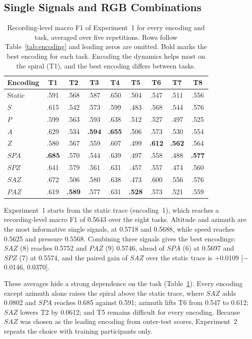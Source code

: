 \subsection{Single Signals and RGB Combinations}
\label{sec:classifiers}
\begin{table}[t]
\centering\small
\caption{Recording-level macro F1 of Experiment~1 for every encoding and task, averaged over five repetitions. Rows follow Table~\ref{tab:encoding} and leading zeros are omitted. Bold marks the best encoding for each task. Encoding the dynamics helps most on the spiral (T1), and the best encoding differs between tasks.}
\label{tab:heatmap}
\setlength{\tabcolsep}{3pt}
\begin{tabular}{@{}lcccccccc@{}}
\toprule
Encoding & T1 & T2 & T3 & T4 & T5 & T6 & T7 & T8\\
\midrule
Static & .591 & .568 & .587 & .650 & .504 & .547 & .511 & .556\\
\midrule
$S$ & .615 & .542 & .573 & .599 & .483 & .568 & .544 & .576\\
$P$ & .599 & .563 & .593 & .638 & .512 & .527 & .497 & .525\\
$A$ & .629 & .534 & \textbf{.594} & \textbf{.655} & .506 & .573 & .530 & .554\\
$Z$ & .580 & .567 & .559 & .607 & .499 & \textbf{.612} & \textbf{.562} & .564\\
\midrule
$SPA$ & \textbf{.685} & .570 & .544 & .639 & .497 & .558 & .488 & \textbf{.577}\\
$SPZ$ & .641 & .579 & .561 & .631 & .457 & .557 & .474 & .560\\
$SAZ$ & .672 & .506 & .580 & .638 & .473 & .600 & .556 & .576\\
$PAZ$ & .619 & \textbf{.589} & .577 & .631 & \textbf{.528} & .573 & .521 & .559\\
\bottomrule
\end{tabular}
\end{table}
\noindent
Experiment~1 starts from the static trace (encoding~1), which reaches a recording-level macro F1 of 0.5643 over the eight tasks. Altitude and azimuth are the most informative single signals, at 0.5718 and 0.5688, while speed reaches 0.5625 and pressure 0.5568. Combining three signals gives the best encodings: $SAZ$ (8) reaches 0.5752 and $PAZ$ (9) 0.5746, ahead of $SPA$ (6) at 0.5697 and $SPZ$ (7) at 0.5574, and the paired gain of $SAZ$ over the static trace is +0.0109 [$-$0.0146, 0.0370].

These averages hide a strong dependence on the task (Table~\ref{tab:heatmap}). Every encoding except azimuth alone raises the spiral above the static trace, where $SAZ$ adds 0.0802 and $SPA$ reaches 0.685 against 0.591; azimuth lifts T6 from 0.547 to 0.612; $SAZ$ lowers T2 by 0.0612; and T5 remains difficult for every encoding. Because $SAZ$ was chosen as the leading encoding from outer-test scores, Experiment~2 repeats the choice with training participants only.

